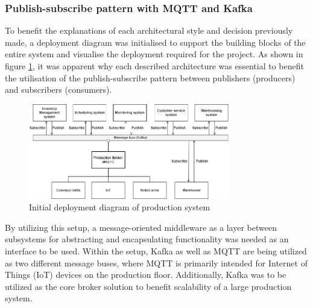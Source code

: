 \subsubsection{Publish-subscribe pattern with MQTT and Kafka}
To benefit the explanations of each architectural style and decision previously made, a deployment diagram was initialised to support the building blocks of the entire system and visualise the deployment required for the project. As shown in figure \ref{fig:deployment-diagram}, it was apparent why each described architecture was essential to benefit the utilisation of the publish-subscribe pattern between publishers (producers) and subscribers (consumers).
\begin{figure}[h]
    \includegraphics[width=250pt]{images/deployment-diagram.png}
    \caption{Initial deployment diagram of production system}
    \label{fig:deployment-diagram}
\end{figure}

By utilizing this setup, a message-oriented middleware as a layer between subsystems for abstracting and encapsulating functionality was needed as an interface to be used. Within the setup, Kafka as well as MQTT are being utilized as two different message buses, where MQTT is primarily intended for Internet of Things (IoT) devices on the production floor. Additionally, Kafka was to be utilized as the core broker solution to benefit scalability of a large production system.  


